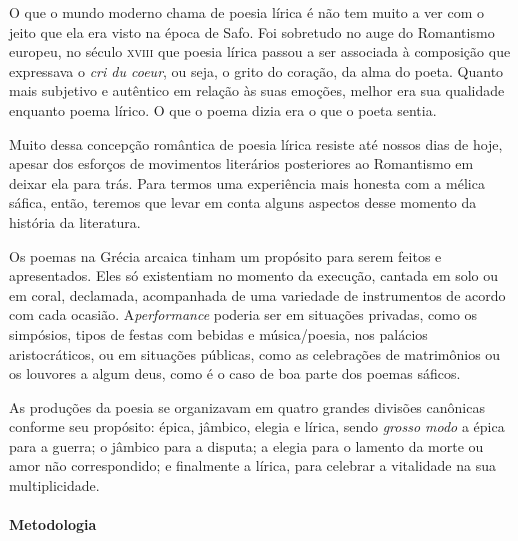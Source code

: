 \documentclass[12pt]{extarticle}
\begin{document}
O que o mundo moderno chama de poesia lírica é não tem muito a ver com
o jeito que ela era visto na época de Safo. Foi sobretudo no auge do
Romantismo europeu, no século \textsc{xviii} que poesia lírica passou a ser
associada à composição que expressava o \textit{cri du coeur}, ou seja,
o grito do coração, da alma do poeta. Quanto mais subjetivo e autêntico
em relação às suas emoções, melhor era sua qualidade enquanto poema
lírico. O que o poema dizia era o que o poeta sentia. 

Muito dessa concepção romântica de poesia lírica resiste até nossos dias
de hoje, apesar dos esforços de movimentos literários posteriores ao Romantismo
em deixar ela para trás. Para termos uma experiência mais honesta com a mélica 
sáfica, então, teremos que levar em conta alguns aspectos desse momento da 
história da literatura.

Os poemas na Grécia arcaica tinham um propósito para serem feitos e apresentados. 
Eles só existentiam no momento da execução, cantada em solo ou em coral, 
declamada, acompanhada de uma variedade de instrumentos de acordo com cada ocasião. 
A\textit{performance} poderia ser em situações privadas, como os simpósios, tipos 
de festas com bebidas e música/poesia, nos palácios aristocráticos, ou em situações 
públicas, como as celebrações de matrimônios ou os louvores a algum deus, como é o
caso de boa parte dos poemas sáficos. 

As produções da poesia se organizavam em quatro grandes divisões canônicas conforme
seu propósito: épica, jâmbico, elegia e lírica, sendo \emph{grosso modo} a épica 
para a guerra; o jâmbico para a disputa; a elegia para o lamento da morte ou amor 
não correspondido; e finalmente a lírica, para celebrar a vitalidade na sua multiplicidade.

\paragraph{Metodologia} 
\end{document}
